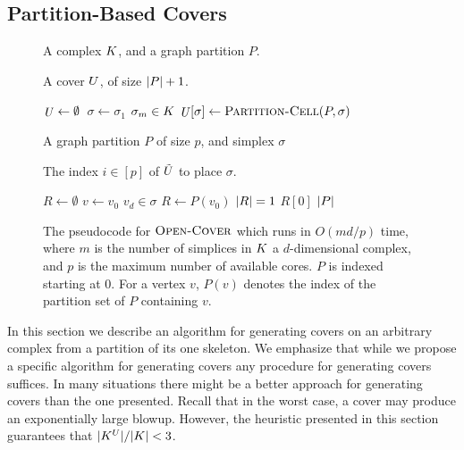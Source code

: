 \documentclass{elsarticle}
\begin{document}
\subsection{Partition-Based Covers}

\label{sec:partition-based-covers}
\label{sec:pcover}
\begin{figure}[h!]
\centering
\begin{minipage}[b]{.45\textwidth}
\begin{description}
\addtolength{\itemsep}{-.65\baselineskip}
\item[\small\textbf{Input:}] \small A complex $K$, and a graph partition $P$.
\item[\small\textbf{Output:}] \small A cover $U$, of size $|P|+1$.
\end{description}
\begin{codebox}
 \li	$\id{\C} \gets \emptyset$
 \li  \Parfor\,$ \sigma \gets \sigma_1$ \To $\sigma_m \in K$
 \li 	   \Do  $\id{\C}[\sigma] \gets \proc{Partition-Cell}(P,\sigma)$
          \End
 \li \Return \id{\C}
  \End
\end{codebox}
\end{minipage}
\begin{minipage}[b]{.45\textwidth}
\begin{description}
\addtolength{\itemsep}{-.65\baselineskip}
\item[\small \textbf{Input:}] \small A graph partition $P$ of size $p$, and simplex $\sigma$
\item[\small \textbf{Output:}] \small The index $i \in [p]$ of  $\tilde{U}$ to place $\sigma$.
\end{description}
\begin{codebox}
 \li	$R \gets \emptyset$
 \li  \For $v \gets v_0$ \To $v_d \in \sigma$
 \li 	   \Do $R \gets P(v_0)$
          \End
 \li	\If $|R| = 1$ \Return $R[0]$
 \li    \Else \Return $|P|$
\end{codebox}
\end{minipage}
\caption{The pseudocode for $\textnormal{\scshape Open-Cover}$ which runs in $O(md/p)$ time, where $m$ is the 
number of simplices in $K$ a $d$-dimensional complex, and $p$ is the 
maximum number of available cores. $P$ is indexed starting at 0. For a vertex $v$, $P(v)$ 
denotes the index of the partition set of $P$ containing $v$.
}
\label{alg:open-cov}
\end{figure}
In this section we describe an algorithm for generating covers on an 
arbitrary complex from a partition of its one skeleton. We emphasize that while we propose a specific
algorithm for generating covers any procedure for generating covers suffices. In many situations there might be a 
better approach for generating covers than the one presented. Recall that in the worst case, a cover may produce an exponentially large blowup. 
However, the heuristic presented in this section guarantees that $|K^{U}|/|K| < 3$. 
\end{document}
